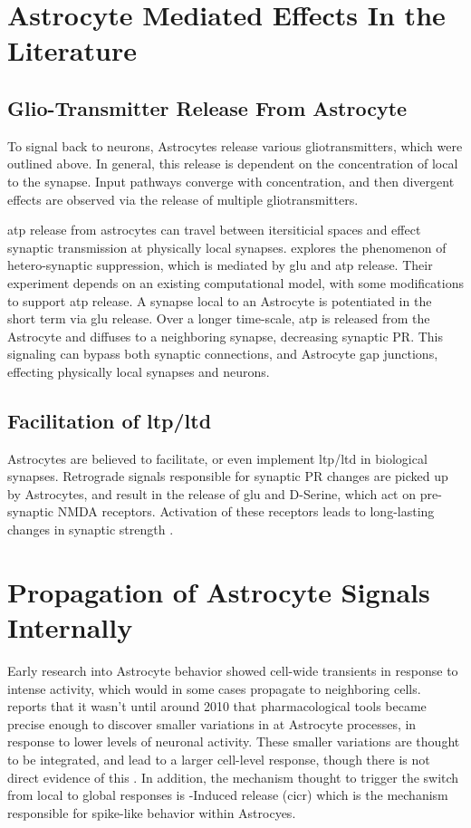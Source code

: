     
    \section{Astrocyte Mediated Effects In the Literature}
    \subsection{Glio-Transmitter Release From Astrocyte}
    To signal back to neurons, Astrocytes release various gliotransmitters,
    which were outlined above. In general, this release is dependent on the
    concentration of \ca local to the synapse. Input pathways converge with
    \ca concentration, and then divergent effects are observed via the release
    of multiple gliotransmitters.

    \Gls{atp} release from astrocytes can travel between itersiticial spaces and
    effect synaptic transmission at physically local
    synapses. \parencite{postnov_2009} explores the phenomenon of
    hetero-synaptic suppression, which is mediated by \Gls{glu} and \Gls{atp}
    release. Their experiment depends on an existing computational model, with
    some modifications to support \Gls{atp} release. A synapse local to an
    Astrocyte is potentiated in the short term via \Gls{glu} release. Over a
    longer time-scale, \Gls{atp} is released from the Astrocyte and diffuses to
    a neighboring synapse, decreasing synaptic PR. This signaling can bypass
    both synaptic connections, and Astrocyte gap junctions, effecting physically
    local synapses and neurons.

    \subsection{Facilitation of \Gls{ltp}/\Gls{ltd}}
    Astrocytes are believed to facilitate, or even implement \Gls{ltp}/\Gls{ltd} in
    biological synapses. Retrograde signals responsible for synaptic PR changes
    are picked up by Astrocytes, and result in the release of \Gls{glu} and D-Serine,
    which act on pre-synaptic NMDA receptors. Activation of these receptors
    leads to long-lasting changes in synaptic strength \cite{min_2012}.

    \section{Propagation of Astrocyte Signals Internally}
    Early research into Astrocyte behavior showed cell-wide \ca transients in
    response to intense activity, which would in some cases propagate to
    neighboring cells. \parencite{manninen_2018} reports that it wasn't until around
    2010 that pharmacological tools became precise enough to discover smaller
    variations in \ca at Astrocyte processes, in response to lower levels of
    neuronal activity. These smaller variations are thought to be integrated,
    and lead to a larger cell-level \ca response, though there is not direct
    evidence of this \cite{araque_2014}. In addition, the mechanism thought to
    trigger the switch from local to global responses is \ca-Induced \ca
    release (\Gls{cicr}) which is the mechanism responsible for spike-like behavior
    within Astrocyes.

